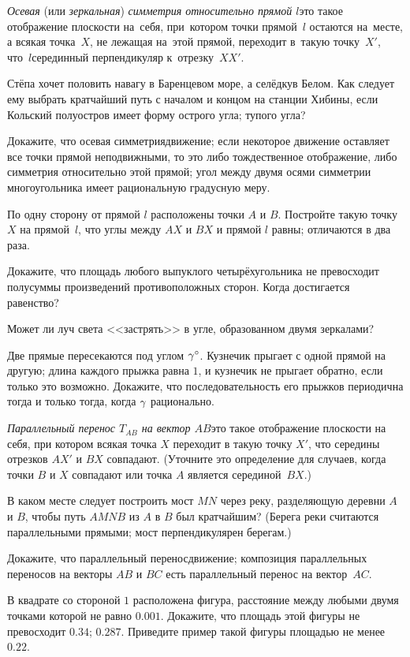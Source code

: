 \documentclass[a4paper,12pt]{article}
\begin{document}
\emph{Осевая} (или \emph{зеркальная}) \emph{симметрия относительно прямой $l$}\т это такое отображение плоскости на~себя, при~котором точки прямой~$l$ остаются на~месте, а всякая точка~$X$, не лежащая на~этой прямой, переходит в~такую точку~$X'$, что~$l$\т серединный перпендикуляр к~отрезку~$XX'$.


Стёпа хочет половить навагу в Баренцевом море, а селёдку\т в Белом. Как следует ему выбрать кратчайший путь с началом и концом на станции Хибины, если Кольский полуостров имеет форму
 острого угла;
 тупого угла?

\vfill
{}
\newpage

Докажите, что
 осевая симметрия\т движение;
 если некоторое движение оставляет все точки прямой неподвижными, то это либо тождественное отображение, либо симметрия относительно этой прямой;
 угол между двумя осями симметрии многоугольника имеет рациональную градусную меру.


По одну сторону от прямой $l$ расположены точки $A$ и $B$. Постройте такую точку $X$ на прямой~$l$, что углы между $AX$ и $BX$ и прямой $l$
 равны;
 отличаются в два раза.


 Докажите, что площадь любого выпуклого четырёхугольника не превосходит полусуммы произведений противоположных сторон.
 Когда достигается равенство?


Может ли луч света <<застрять>> в угле, образованном двумя зеркалами?

Две прямые пересекаются под углом $\gamma^{\circ}$. Кузнечик прыгает с одной прямой на другую; длина каждого прыжка равна $1$, и кузнечик не прыгает обратно, если только это возможно. Докажите, что последовательность его прыжков периодична тогда и только тогда, когда $\gamma$ рационально.

\emph{Параллельный перенос $T_{AB}$ на вектор $AB$}\т это такое отображение плоскости на себя, при котором всякая точка $X$ переходит в такую точку $X'$, что середины отрезков $AX'$ и $BX$ совпадают. (Уточните это определение для случаев, когда точки $B$ и $X$ совпадают или точка $A$ является серединой~$BX$.)


В каком месте следует построить мост $MN$ через реку, разделяющую деревни $A$ и $B$, чтобы путь $AMNB$ из $A$ в $B$ был кратчайшим? (Берега реки считаются параллельными прямыми; мост перпендикулярен берегам.)


Докажите, что
 параллельный перенос\т движение;
 композиция параллельных переносов на векторы $AB$ и $BC$ есть параллельный перенос на вектор~$AC$.


В квадрате со стороной $1$ расположена фигура, расстояние между любыми двумя точками которой не равно $0.001$. Докажите, что площадь этой фигуры не превосходит  $0.34$;  $0.287$.
 Приведите пример такой фигуры площадью не менее $0.22$.

\vfill
{}

\end{document}

